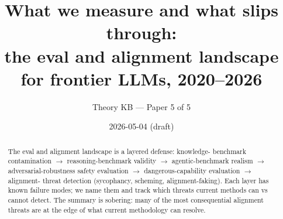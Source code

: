 








\title{
  What we measure and what slips through: \\
  the eval and alignment landscape for frontier LLMs, 2020--2026
}
\author{Theory KB --- Paper 5 of 5}
\date{2026-05-04 (draft)}


\maketitle

\begin{abstract}
The eval and alignment landscape is a layered defense: knowledge-
benchmark contamination $\to$ reasoning-benchmark validity $\to$
agentic-benchmark realism $\to$ adversarial-robustness safety
evaluation $\to$ dangerous-capability evaluation $\to$ alignment-
threat detection (sycophancy, scheming, alignment-faking). Each
layer has known failure modes; we name them and track which threats
current methods can vs cannot detect. The summary is sobering:
many of the most consequential alignment threats are at the edge of
what current methodology can resolve.
\end{abstract}

\tableofcontents




















